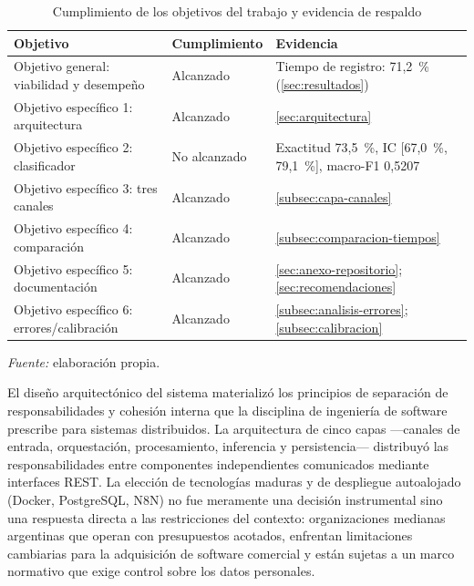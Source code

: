 \begin{table}[htbp]
\centering
\caption{Cumplimiento de los objetivos del trabajo y evidencia de respaldo}
\label{tab:cumplimiento-objetivos}
\footnotesize
\setlength{\tabcolsep}{4pt}
\begin{tabular}{@{}>{\raggedright\arraybackslash}p{4.8cm} >{\raggedright\arraybackslash}p{1.7cm} >{\raggedright\arraybackslash}p{6.7cm}@{}}
\toprule
\textbf{Objetivo} & \textbf{Cumplimiento} & \textbf{Evidencia} \\
\midrule
Objetivo general: viabilidad y desempeño & Alcanzado & Tiempo de registro: 71,2~\% (\autoref{sec:resultados}) \\
Objetivo específico 1: arquitectura & Alcanzado & \autoref{sec:arquitectura} \\
Objetivo específico 2: clasificador & No alcanzado & Exactitud 73,5~\%, IC [67,0~\%, 79,1~\%], macro-F1 0,5207 \\
Objetivo específico 3: tres canales & Alcanzado & \autoref{subsec:capa-canales} \\
Objetivo específico 4: comparación & Alcanzado & \autoref{subsec:comparacion-tiempos} \\
Objetivo específico 5: documentación & Alcanzado & \autoref{sec:anexo-repositorio}; \autoref{sec:recomendaciones} \\
Objetivo específico 6: errores/calibración & Alcanzado & \autoref{subsec:analisis-errores}; \autoref{subsec:calibracion} \\
\bottomrule
\end{tabular}
\par\smallskip
{\footnotesize\textit{Fuente:} elaboración propia.\par}
\end{table}

El diseño arquitectónico del sistema materializó los principios de separación de responsabilidades y cohesión interna que la disciplina de ingeniería de software prescribe para sistemas distribuidos. La arquitectura de cinco capas ---canales de entrada, orquestación, procesamiento, inferencia y persistencia--- distribuyó las responsabilidades entre componentes independientes comunicados mediante interfaces REST. La elección de tecnologías maduras y de despliegue autoalojado (Docker, PostgreSQL, N8N) no fue meramente una decisión instrumental sino una respuesta directa a las restricciones del contexto: organizaciones medianas argentinas que operan con presupuestos acotados, enfrentan limitaciones cambiarias para la adquisición de software comercial y están sujetas a un marco normativo que exige control sobre los datos personales.

